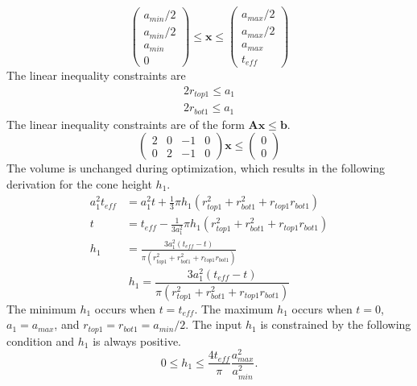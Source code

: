 \documentclass[12pt]{article}
\numberwithin{equation}{section}
\numberwithin{equation}{section}
\begin{document}
\begin{equation}
\left(
\begin{matrix}
a_{min}/2\\ 
a_{min}/2\\
a_{min}\\ 
0 
\end{matrix} \right )
\leq \mathbf{x}
 \leq 
 \left(
\begin{matrix}
a_{max}/2 \\ a_{max}/2 \\ a_{max}  \\ t_{eff}
\end{matrix} \right )
\end{equation}
The linear inequality constraints are 
\begin{align*}   
2r_{top1} \leq a_1 \\
2r_{bot1} \leq a_1 
\end{align*}
The linear inequality constraints are of the form $\mathbf{A} \mathbf{x} \leq \mathbf{b}$.
\begin{equation}
\left(
\begin{matrix}
2 & 0 & -1  &  0 \\
0 & 2 & -1 & 0 
\end{matrix}
\right ) \mathbf{x}  \leq \left ( \begin{matrix} 0\\ 0 \end{matrix} \right ) 
\end{equation}
The volume is unchanged during optimization, which results in the following derivation for the cone height $h_1$.  
\begin{align}
 a_{1}^2t_{eff} &= a_{1}^2t + \frac{1}{3}\pi h_1(r_{top1}^2+r_{bot1}^2+r_{top1}r_{bot1}) \nonumber \\
 t &= t_{eff} - \frac{1}{3 a_{1}^2}\pi h_1(r_{top1}^2+r_{bot1}^2+r_{top1}r_{bot1}) \nonumber \\
h_1 &= \frac{3 a_1^2 (t_{eff} - t)}{\pi (r_{top1}^2+r_{bot1}^2+r_{top1}r_{bot1})}
 \end{align}
 \begin{equation}
\boxed{h_1 = \frac{3 a_1^2 (t_{eff} - t)}{\pi (r_{top1}^2+r_{bot1}^2+r_{top1}r_{bot1})} }
 \end{equation}
 The minimum $h_1$ occurs when $t = t_{eff}$.  
The maximum $h_1$ occurs when $t = 0$, $a_1 = a_{max}$, and $r_{top1} = r_{bot1} = a_{min}/2$. The input $h_1$ is constrained by  the following condition and $h_1$ is always positive.
\begin{equation*}
0 \leq h_{1} \leq \frac{4 t_{eff}}{\pi} \frac{a_{max}^2}{a_{min}^2}.
\end{equation*}
\end{document}
